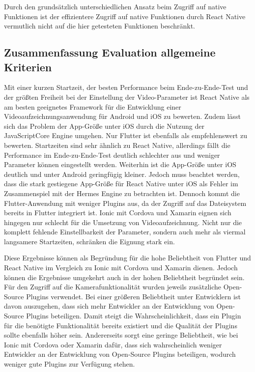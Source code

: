 Durch den grundsätzlich unterschiedlichen Ansatz beim Zugriff auf native Funktionen ist der effizientere Zugriff auf native Funktionen durch React Native vermutlich nicht auf die hier getesteten Funktionen beschränkt.


\subsection{Zusammenfassung Evaluation allgemeine Kriterien}

Mit einer kurzen Startzeit, der besten Performance beim Ende-zu-Ende-Test und der größten Freiheit bei der Einstellung der Video-Parameter ist React Native als am besten geeignetes Framework für die Entwicklung einer Videoaufzeichnungsanwendung für Android und iOS zu bewerten.
Zudem lässt sich das Problem der App-Größe unter iOS durch die Nutzung der JavaScriptCore Engine umgehen.
Nur Flutter ist ebenfalls als empfehlenswert zu bewerten.
Startzeiten sind sehr ähnlich zu React Native, allerdings fällt die Performance im Ende-zu-Ende-Test deutlich schlechter aus und weniger Parameter können eingestellt werden.
Weiterhin ist die App-Größe unter iOS deutlich und unter Android geringfügig kleiner.
Jedoch muss beachtet werden, dass die stark gestiegene App-Größe für React Native unter iOS als Fehler im Zusammenspiel mit der Hermes Engine zu betrachten ist.
Dennoch kommt die Flutter-Anwendung mit weniger Plugins aus, da der Zugriff auf das Dateisystem bereits in Flutter integriert ist.
Ionic mit Cordova und Xamarin eignen sich hingegen nur schlecht für die Umsetzung von Videoaufzeichnung.
Nicht nur die komplett fehlende Einstellbarkeit der Parameter, sondern auch mehr als viermal langsamere Startzeiten, schränken die Eignung stark ein. 

Diese Ergebnisse können als Begründung für die hohe Beliebtheit von Flutter und React Native im Vergleich zu Ionic mit Cordova und Xamarin dienen.
Jedoch können die Ergebnisse umgekehrt auch in der hohen Beliebtheit begründet sein.
Für den Zugriff auf die Kamerafunktionalität wurden jeweils zusätzliche Open-Source Plugins verwendet.
Bei einer größeren Beliebtheit unter Entwicklern ist davon auszugehen, dass sich mehr Entwickler an der Entwicklung von Open-Source Plugins beteiligen.
Damit steigt die Wahrscheinlichkeit, dass ein Plugin für die benötigte Funktionalität bereits existiert und die Qualität der Plugins sollte ebenfalls höher sein.
Andererseits sorgt eine geringe Beliebtheit, wie bei Ionic mit Cordova oder Xamarin dafür, dass sich wahrscheinlich weniger Entwickler an der Entwicklung von Open-Source Plugins beteiligen, wodurch weniger gute Plugins zur Verfügung stehen.